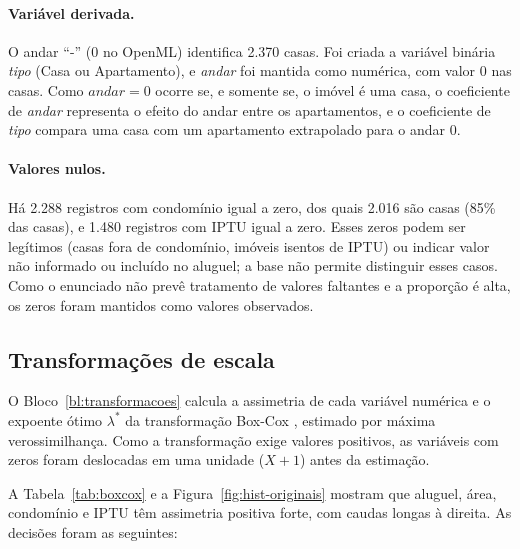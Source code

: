 \documentclass[12pt,a4paper]{article}
\begin{document}
\paragraph{Variável derivada.} O andar ``-'' (0 no OpenML) identifica 2.370 casas. Foi criada a variável binária \textit{tipo} (Casa ou Apartamento), e \textit{andar} foi mantida como numérica, com valor 0 nas casas. Como $\textit{andar}=0$ ocorre se, e somente se, o imóvel é uma casa, o coeficiente de \textit{andar} representa o efeito do andar entre os apartamentos, e o coeficiente de \textit{tipo} compara uma casa com um apartamento extrapolado para o andar 0.

\paragraph{Valores nulos.} Há 2.288 registros com condomínio igual a zero, dos quais 2.016 são casas (85\% das casas), e 1.480 registros com IPTU igual a zero. Esses zeros podem ser legítimos (casas fora de condomínio, imóveis isentos de IPTU) ou indicar valor não informado ou incluído no aluguel; a base não permite distinguir esses casos. Como o enunciado não prevê tratamento de valores faltantes e a proporção é alta, os zeros foram mantidos como valores observados.

\subsection{Transformações de escala}

O Bloco~\ref{bl:transformacoes} calcula a assimetria de cada variável numérica e o expoente ótimo $\lambda^*$ da transformação Box-Cox \cite{boxcox}, estimado por máxima verossimilhança. Como a transformação exige valores positivos, as variáveis com zeros foram deslocadas em uma unidade ($X+1$) antes da estimação.



\begin{table}[H]
\centering
\caption{Assimetria antes e depois das transformações. BC: Box-Cox com o $\lambda^*$ estimado; para vagas, andar, condomínio e IPTU, BC e logaritmo foram calculados sobre $X+1$.}
\label{tab:boxcox}
\footnotesize
\setlength{\tabcolsep}{4.5pt}

\end{table}

A Tabela~\ref{tab:boxcox} e a Figura~\ref{fig:hist-originais} mostram que aluguel, área, condomínio e IPTU têm assimetria positiva forte, com caudas longas à direita. As decisões foram as seguintes:
\end{document}
